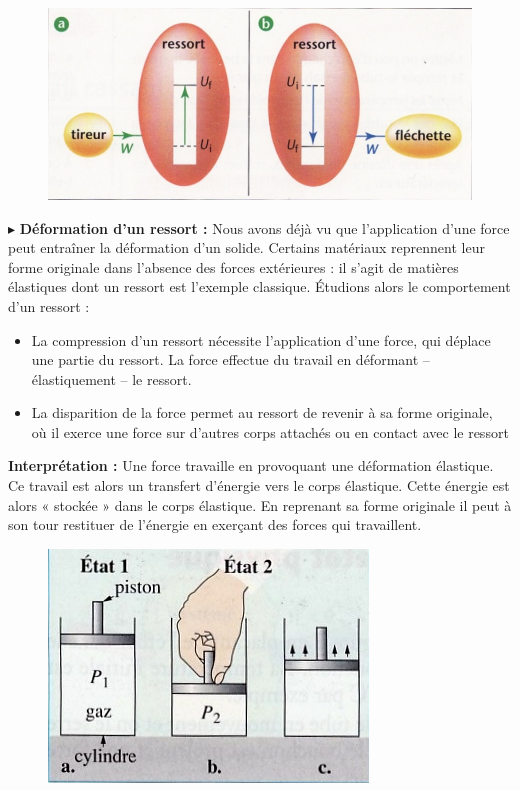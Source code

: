 \documentclass[11pt,a4paper]{article}
\begin{document}
\begin{figure}
  \centering
  \includegraphics[width=.95\linewidth]{imgs/p4/ressort2.jpg}
\end{figure}

$\blacktriangleright$ \textbf{Déformation d'un ressort : }
Nous avons déjà vu que l’application d’une force peut entraîner la déformation d’un solide.  Certains matériaux reprennent leur forme originale dans l’absence des forces extérieures : il s’agit de matières élastiques dont un ressort est l’exemple classique.  Étudions alors  le comportement d’un ressort :
\begin{itemize}
    \item La compression d’un ressort nécessite l’application d’une force, qui déplace une partie du ressort.  La force effectue du travail en déformant – élastiquement – le ressort.
    \item La disparition de la force permet au ressort de revenir à sa forme originale, où il exerce une force sur d’autres corps attachés ou en contact avec le ressort
\end{itemize}
\textbf{Interprétation : } Une force travaille en provoquant une déformation élastique.  Ce travail est alors un transfert d’énergie  vers le corps élastique.  Cette énergie est alors « stockée » dans le corps élastique.  En reprenant sa forme originale il peut à son tour restituer de l’énergie en exerçant des forces qui travaillent.  

\begin{figure}
  \centering
  \includegraphics[width=.95\linewidth]{imgs/p4/pression.jpg}
\end{figure}
\end{document}
